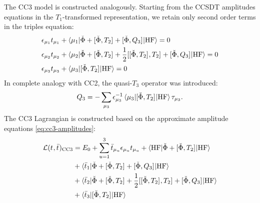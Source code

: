 The \gls{CC3} model is constructed analogously. Starting from the
\acrshort*{CCSDT} amplitudes equations in the $T_1$-transformed
representation, we retain only second order terms in the triples
equation:\autocite{Christiansen1995-pv, Koch1997-nm, Helgaker2000-tz,
Smith2005-an}
\begin{subequations}\label{eq:cc3-amplitudes}
  \begin{align}
    \epsilon_{\mu_1}t_{\mu_1} &+ \braket{\mu_1 |
    \check{\Phi} + [ \check{\Phi}, T_2 ]^{}
    + [ \check{\Phi}, Q_3 ]^{}
    | \mathrm{HF}} = 0 \label{eq:cc3-singles-amplitudes} \\
    \epsilon_{\mu_2}t_{\mu_2} &+ \braket{\mu_2 |
    \check{\Phi} + [ \check{\Phi}, T_2 ]^{}
    + \frac{1}{2}[ [ \check{\Phi}, T_2 ]^{}, T_2 ]^{}
    + [ \check{\Phi}, Q_3 ]^{}
    | \mathrm{HF}} = 0 \label{eq:cc3-doubles-amplitudes} \\
    \epsilon_{\mu_3}t_{\mu_3} &+ \braket{\mu_3 |
    [ \check{\Phi}, T_2 ]^{}
    | \mathrm{HF}} = 0 \label{eq:cc3-triples-amplitudes}
  \end{align}
\end{subequations}
In complete analogy with \acrshort*{CC2}, the quasi-$T_3$ operator was introduced:
\begin{equation}
  Q_3 = - \sum_{\mu_3}
  \epsilon_{\mu_3}^{-1}\braket{\mu_3 | [ \check{\Phi}, T_2 ]^{} | \mathrm{HF}}\tau_{\mu_3}.
\end{equation}
The \acrshort*{CC3} Lagrangian is constructed based on the approximate
amplitude equations
\eqref{eq:cc3-amplitudes}:\autocite{Christiansen1995-pv, Koch1997-nm,
Helgaker2000-tz, Smith2005-an}
\begin{equation}\label{eq:cc3-lagrangian}
  \begin{aligned}
  \mathcal{L}(t_{}, \bar{t}_{})_\mathrm{CC3}
  &=
  E_0
  + \sum_{u=1}^{3}\bar{t}_{\mu_u}\epsilon_{\mu_u}t_{\mu_u}
  + \braket{\mathrm{HF} | \check{\Phi} + [ \check{\Phi}, T_2 ]^{} | \mathrm{HF}} \\
  &+ \braket{\bar{t}_{1} |
  \check{\Phi} + [ \check{\Phi}, T_2 ]^{} + [ \check{\Phi}, Q_3 ]^{}
  | \mathrm{HF}} \\
  &+ \braket{\bar{t}_{2} |
  \check{\Phi} + [ \check{\Phi}, T_2 ]^{}
  + \frac{1}{2}[ [ \check{\Phi}, T_2 ]^{}, T_2 ]^{} + [ \check{\Phi}, Q_3 ]^{}
  | \mathrm{HF}} \\
  &+ \braket{\bar{t}_{3} | [ \check{\Phi}, T_2 ]^{} | \mathrm{HF}}
  \end{aligned}
\end{equation}
